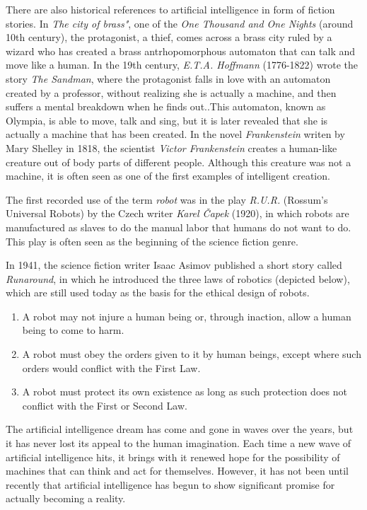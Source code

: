There are also historical references to artificial intelligence in form of fiction stories. In \textit{The city of brass"}, one of the \textit{One Thousand and One Nights} (around 10th century), the protagonist, a thief, comes across a brass city ruled by a wizard who has created a brass antrhopomorphous automaton that can talk and move like a human. In the 19th century, \textit{E.T.A. Hoffmann} (1776-1822) wrote the story \textit{The Sandman}, where the protagonist falls in love with an automaton created by a professor, without realizing she is actually a machine, and then suffers a mental breakdown when he finds out..This automaton, known as Olympia, is able to move, talk and sing, but it is later revealed that she is actually a machine that has been created. In the novel \textit{Frankenstein} writen by Mary Shelley in 1818, the scientist \textit{Victor Frankenstein} creates a human-like creature out of body parts of different people. Although this creature was not a machine, it is often seen as one of the first examples of intelligent creation.


The first recorded use of the term \textit{robot} was in the play \textit{R.U.R.} (Rossum’s Universal Robots) by the Czech writer \textit{Karel Čapek} (1920), in which robots are manufactured as slaves to do the manual labor that humans do not want to do. This play is often seen as the beginning of the science fiction genre. 

In 1941, the science fiction writer Isaac Asimov published a short story called \textit{Runaround}, in which he introduced the three laws of robotics (depicted below), which are still used today as the basis for the ethical design of robots. 


\begin{enumerate}
	
	\item A robot may not injure a human being or, through inaction, allow a human being to come to harm.
	
	\item A robot must obey the orders given to it by human beings, except where such orders would conflict with the First Law.
	
	\item A robot must protect its own existence as long as such protection does not conflict with the First or Second Law.
	
\end{enumerate}

The artificial intelligence dream has come and gone in waves over the years, but it has never lost its appeal to the human imagination. Each time a new wave of artificial intelligence hits, it brings with it renewed hope for the possibility of machines that can think and act for themselves. However, it has not been until recently that artificial intelligence has begun to show significant promise for actually becoming a reality.

